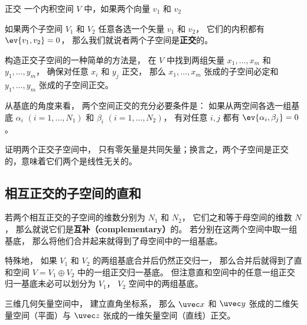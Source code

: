 
\begin{issues}
\issueTODO
\end{issues}



\begin{definition}{正交}
一个内积空间 $V$ 中，如果两个向量 ${v_1}$ 和 ${v_2}$

如果两个子空间 $V_1$ 和 $V_2$ 任意各选一个矢量 ${v_1}$ 和 ${v_2}$， 它们的内积都有 $\ev{v_1, v_2} = 0$， 那么我们就说者两个子空间是\textbf{正交}的。
\end{definition}

构造正交子空间的一种简单的方法是， 在 $V$ 中找到两组矢量 $x_1, \dots, x_m$ 和 $y_1, \dots, y_m$， 确保对任意 $x_i$ 和 $y_j$ 正交， 那么 $x_1, \dots, x_m$ 张成的子空间必定和 $y_1, \dots, y_m$ 张成的子空间正交。

\begin{theorem}{}
从基底的角度来看， 两个空间正交的充分必要条件是： 如果从两空间各选一组基底 ${\alpha_i}$ $(i = 1, \dots, N_1)$ 和 ${\beta_i}$ $(i = 1, \dots, N_2)$， 有对任意 $i, j$ 都有 $\ev{\alpha_i, \beta_j} = 0$。
\end{theorem}

\begin{exercise}{}
证明两个正交子空间中， 只有零矢量是共同矢量；换言之，两个子空间是正交的，意味着它们两个是线性无关的。
\end{exercise}

\subsection{相互正交的子空间的直和}

若两个相互正交的子空间的维数分别为 $N_1$ 和 $N_2$， 它们之和等于母空间的维数 $N$， 那么就说它们是\textbf{互补（complementary）}的。 若分别在这两个空间中取一组基底， 那么将他们合并起来就得到了母空间中的一组基底。

特殊地， 如果 $V_1$ 和 $V_2$ 的两组基底合并后仍然正交归一， 那么合并后就得到了直和空间 $V = V_1 \oplus V_2$ 中的一组正交归一基底。 但注意直和空间中的任意一组正交归一基底未必可以划分为 $V_1$， $V_2$ 空间中的两组基底。

\begin{example}{}
三维几何矢量空间中， 建立直角坐标系， 那么 $\uvec x$ 和 $\uvec y$ 张成的二维矢量空间（平面）与 $\uvec z$ 张成的一维矢量空间（直线）正交。
\end{example}

